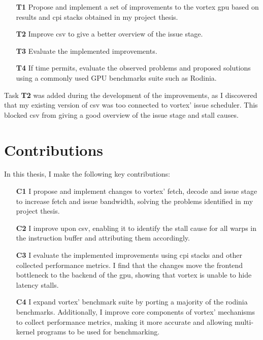 \begin{itemize}
    \item[\textbf{T1}] Propose and implement a set of improvements to the \Gls{vortex} \acrshort{gpu} based on results and \acrshort{cpi} stacks obtained in my project thesis.
    \item[\textbf{T2}] Improve \acrshort{csv} to give a better overview of the issue stage. 
    \item[\textbf{T3}] Evaluate the implemented improvements.
    \item[\textbf{T4}] If time permits, evaluate the observed problems and proposed solutions using a commonly used GPU benchmarks suite such as Rodinia.
\end{itemize}

\newpage
Task \textbf{T2} was added during the development of the improvements, as I discovered that my existing version of \acrshort{csv} was too connected to \Gls{vortex}' issue scheduler. This blocked \acrshort{csv} from giving a good overview of the issue stage and stall causes.

\section{Contributions} \label{sec:contributions}

In this thesis, I make the following key contributions:
\begin{itemize}
    \item[\textbf{C1}] I propose and implement changes to \Gls{vortex}' fetch, decode and issue stage to increase fetch and issue bandwidth, solving the problems identified in my project thesis.
    \item[\textbf{C2}] I improve upon \acrshort{csv}, enabling it to identify the stall cause for all warps in the instruction buffer and attributing them accordingly.
    \item[\textbf{C3}] I evaluate the implemented improvements using \acrshort{cpi} stacks and other collected performance metrics. I find that the changes move the frontend bottleneck to the backend of the \Gls{gpu}, showing that \Gls{vortex} is unable to hide latency stalls.
    \item[\textbf{C4}] I expand \Gls{vortex}' benchmark suite by porting a majority of the \Gls{rodinia} benchmarks. Additionally, I improve core components of \Gls{vortex}' mechanisms to collect performance metrics, making it more accurate and allowing multi-kernel programs to be used for benchmarking.  
\end{itemize}

